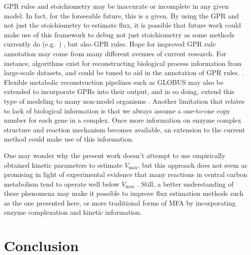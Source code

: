 GPR rules and stoichiometry may be inaccurate or
incomplete in any given model. In fact, for the forseeable future,
this is a given. By using the GPR and not just the stoichiometry to
estimate flux, it is possible that future work could make use of this
framework to debug not just stoichiometry as some methods currently do
(e.g.\ \citealt{Reed14112006}) , but also GPR rules.  Hope for
improved GPR rule annotation may come from many different avenues of
current research. For instance, algorithms exist for reconstructing
biological process information from large-scale datasets, and could be
tuned to aid in the annotation of GPR rules.
\citep{Mitra2013}. Flexible metabolic reconstruction pipelines such as
GLOBUS may also be extended to incorporate GPRs into their output, and
in so doing, extend this type of modeling to many non-model organisms
\citep{Plata2012}.  Another limitation that relates to lack of
biological information is that we always assume a one-to-one copy
number for each gene in a complex. Once more information on enzyme
complex structure and reaction mechanism becomes available, an
extension to the current method could make use of this information.

One may wonder why the present work doesn't attempt to use empirically
obtained kinetic parameters to estimate $V_{\max}$, but this approach
does not seem as promising in light of experimental evidence that many
reactions in central carbon metabolism tend to operate well below
$V_{\max}$ \citep{Bennett2009}. Still, a better understanding of these
phenomena may make it possible to improve flux estimation methods such
as the one presented here, or more traditional forms of MFA
\citep{Shestov2013a} by incorporating enzyme complexation and kinetic
information.




%
%


\section{Conclusion}

